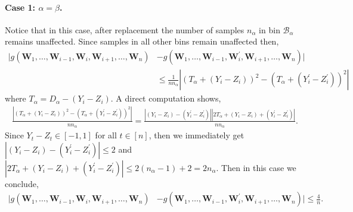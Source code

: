 \documentclass[11pt]{article}
\numberwithin{equation}{section}
\theoremstyle{definition}
\newcommand{\cB}{\mathcal{B}}
\newcommand{\bW}{\bm{W}}
\begin{document}
\paragraph{Case 1: $\alpha = \beta$.} Notice that in this case, after replacement the number of samples $n_\alpha$ in bin $\cB_\alpha$ remains unaffected. Since samples in all other bins remain unaffected then,
\begin{align*}
    \big|g(\bW_1,\ldots, \bW_{i-1}, \bW_i,\bW_{i+1}, \ldots, \bW_n) 
    & - g(\bW_1,\ldots, \bW_{i-1}, \bW_i^\prime,\bW_{i+1}, \ldots, \bW_n)\big|\\
    & \leq \frac{1}{nn_\alpha}\left|(T_\alpha + (Y_i-Z_i))^2 - (T_\alpha + (Y_i^\prime-Z_i^\prime))^2\right|
\end{align*}
where $T_\alpha = D_\alpha - (Y_i-Z_i)$. A direct computation shows,
\begin{align*}
    \frac{\left|(T_\alpha + (Y_i-Z_i))^2 - (T_\alpha + (Y_i^\prime-Z_i^\prime))^2\right|}{nn_\alpha} = \frac{|(Y_i-Z_i) - (Y_i^\prime - Z_i^\prime)||2T_\alpha + (Y_i-Z_i) + (Y_i^\prime - Z_i^\prime)|}{nn_\alpha}.
\end{align*}
Since $Y_t-Z_t\in [-1,1]$ for all $t\in [n]$, then we immediately get $|(Y_i-Z_i) - (Y_i^\prime - Z_i^\prime)|\leq 2$ and $|2T_\alpha + (Y_i-Z_i) + (Y_i^\prime - Z_i^\prime)|\leq 2(n_\alpha-1) + 2 = 2n_\alpha$. Then in this case we conclude,
\begin{align}\label{eq:bound_g_diff_1}
    \big|g(\bW_1,\ldots, \bW_{i-1}, \bW_i,\bW_{i+1}, \ldots, \bW_n) 
    & - g(\bW_1,\ldots, \bW_{i-1}, \bW_i^\prime,\bW_{i+1}, \ldots, \bW_n)\big|\leq \frac{4}{n}.
\end{align}
\end{document}
